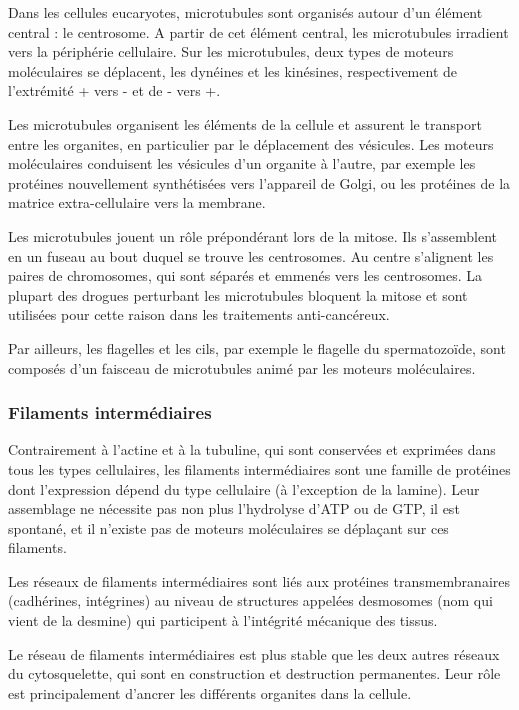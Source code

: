 Dans les cellules eucaryotes, microtubules sont organisés autour d'un élément central : le centrosome. A partir de cet élément central, les microtubules irradient vers la périphérie cellulaire. 
Sur les microtubules, deux types de moteurs moléculaires se déplacent, les dynéines et les kinésines, respectivement de l'extrémité + vers - et de - vers +.  

Les microtubules organisent les éléments de la cellule et assurent le transport entre les organites, en particulier par le déplacement des vésicules. Les moteurs moléculaires conduisent les vésicules d'un organite à l'autre, par exemple les protéines nouvellement synthétisées vers l'appareil de Golgi, ou les protéines de la matrice extra-cellulaire vers la membrane. 

Les microtubules jouent un rôle prépondérant lors de la mitose. Ils s'assemblent en un fuseau au bout duquel se trouve les centrosomes. Au centre s'alignent les paires de chromosomes, qui sont séparés et emmenés vers les centrosomes. La plupart des drogues perturbant les microtubules bloquent la mitose et sont utilisées pour cette raison dans les traitements anti-cancéreux. 

Par ailleurs, les flagelles et les cils, par exemple le flagelle du spermatozoïde, sont composés d'un faisceau de microtubules animé par les moteurs moléculaires. 

\subsubsection{Filaments intermédiaires}

Contrairement à l'actine et à la tubuline, qui sont conservées et exprimées dans tous les types cellulaires, les filaments intermédiaires sont une famille de protéines dont l'expression dépend du type cellulaire (à l'exception de la lamine). 
Leur assemblage ne nécessite pas non plus l'hydrolyse d'ATP ou de GTP, il est spontané, et il n'existe pas de moteurs moléculaires se déplaçant sur ces filaments. 

Les réseaux de filaments intermédiaires sont liés aux protéines transmembranaires (cadhérines, intégrines) au niveau de structures appelées desmosomes (nom qui vient de la desmine) qui participent à l'intégrité mécanique des tissus. 

Le réseau de filaments intermédiaires est plus stable que les deux autres réseaux du cytosquelette, qui sont en construction et destruction permanentes. Leur rôle est principalement d'ancrer les différents organites dans la cellule. 

